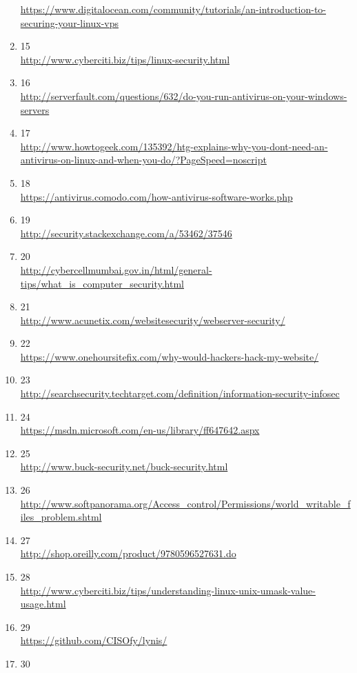 \documentclass[a4paper,12pt]{article}
\begin{document}
\begin{sloppypar}
\begin{enumerate}
	\url{https://www.digitalocean.com/community/tutorials/an-introduction-to-securing-your-linux-vps}
\item 15 \\
	\url{http://www.cyberciti.biz/tips/linux-security.html}
\item 16 \\
	\url{http://serverfault.com/questions/632/do-you-run-antivirus-on-your-windows-servers}
\item 17 \\
	\url{http://www.howtogeek.com/135392/htg-explains-why-you-dont-need-an-antivirus-on-linux-and-when-you-do/?PageSpeed=noscript}
\item 18 \\
	\url{https://antivirus.comodo.com/how-antivirus-software-works.php}
\item 19 \\
	\url{http://security.stackexchange.com/a/53462/37546}
\item 20 \\
	\url{http://cybercellmumbai.gov.in/html/general-tips/what\_is\_computer\_security.html}
\item 21 \\
	\url{http://www.acunetix.com/websitesecurity/webserver-security/}
\item 22 \\
	\url{https://www.onehoursitefix.com/why-would-hackers-hack-my-website/}
\item 23 \\
	\url{http://searchsecurity.techtarget.com/definition/information-security-infosec}
\item 24 \\
	\url{https://msdn.microsoft.com/en-us/library/ff647642.aspx}
\item 25 \\
	\url{http://www.buck-security.net/buck-security.html}
\item 26 \\
	\url{http://www.softpanorama.org/Access\_control/Permissions/world\_writable\_files\_problem.shtml}
\item 27 \\
	\url{http://shop.oreilly.com/product/9780596527631.do}
\item 28 \\
	\url{http://www.cyberciti.biz/tips/understanding-linux-unix-umask-value-usage.html}
\item 29 \\
	\url{https://github.com/CISOfy/lynis/}
\item 30 \\

\end{enumerate}
\end{sloppypar}
\end{document}

